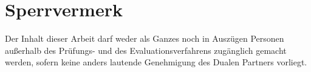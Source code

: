 \chapter*{Sperrvermerk}

Der Inhalt dieser Arbeit darf weder als Ganzes noch in Auszügen Personen außerhalb des
Prüfungs- und des Evaluationsverfahrens zugänglich gemacht werden, sofern keine anders
lautende Genehmigung des Dualen Partners vorliegt.


